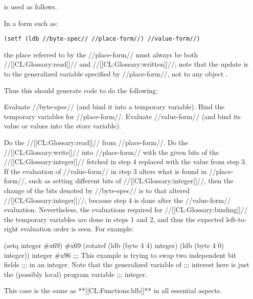 is used as follows.
\beginlist
{} 


 
In a form such as:
       
{\tt (setf (ldb //byte-spec// //place-form//) //value-form//)}
 
the place referred to by the //place-form// must always be both //[[CL:Glossary:read]]// 
and //[[CL:Glossary:written]]//;  note that the update is to the generalized variable 
specified by //place-form//, not to any object .
       
Thus this  should generate code to do the following:
 
\beginlist
{} Evaluate //byte-spec// (and bind it into a temporary variable).
 Bind the temporary variables for //place-form//.
 Evaluate //value-form//  (and bind 
its value or values into the store variable).



 Do the //[[CL:Glossary:read]]// from //place-form//.
 Do the //[[CL:Glossary:write]]// into //place-form// with 
the given bits of the //[[CL:Glossary:integer]]//
       fetched in step 4 replaced with the value from step 3.
\endlist 
    If the evaluation of //value-form// 
in step 3 alters what is found in //place-form//,
such as setting different bits of //[[CL:Glossary:integer]]//,
    then the change of the bits denoted by 
//byte-spec// is to that 
    altered //[[CL:Glossary:integer]]//, 
because step 4 is done after the //value-form//
    evaluation.  Nevertheless, the 
    evaluations required for //[[CL:Glossary:binding]]// 
the temporary variables are done in steps 1 and 
    2, and thus the expected left-to-right evaluation order is seen.
For example:

\code
 (setq integer #x69) \EV #x69
 (rotatef (ldb (byte 4 4) integer) 
          (ldb (byte 4 0) integer))
 integer \EV #x96
;;; This example is trying to swap two independent bit fields 
;;; in an integer.  Note that the generalized variable of 
;;; interest here is just the (possibly local) program variable
;;; integer.
\endcode
 
 
   This case is the same as **[[CL:Functions:ldb]]** in all essential aspects.
 
 
